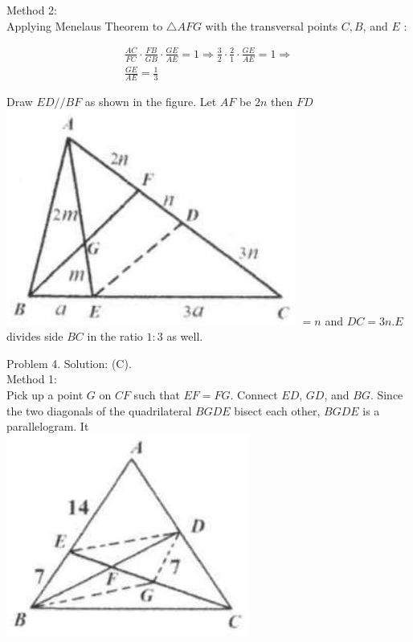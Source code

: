 \documentclass[10pt]{article}
\begin{document}
Method 2:\\
Applying Menelaus Theorem to \(\triangle A F G\) with the transversal points \(C, B\), and \(E\) :

\[
\begin{gathered}
\frac{A C}{F C} \cdot \frac{F B}{G B} \cdot \frac{G E}{A E}=1 \Rightarrow \frac{3}{2} \cdot \frac{2}{1} \cdot \frac{G E}{A E}=1 \Rightarrow \\
\frac{G E}{A E}=\frac{1}{3}
\end{gathered}
\]

Draw \(E D / / B F\) as shown in the figure. Let \(A F\) be \(2 n\) then \(F D\)\\
\includegraphics[max width=\textwidth]{2025_04_17_97bc1f7e44d93c271a88g-132(3)} \(=n\) and \(D C=3 n . E\) divides side \(B C\) in the ratio \(1: 3\) as well.

Problem 4. Solution: (C).\\
Method 1:\\
Pick up a point \(G\) on \(C F\) such that \(E F=F G\). Connect \(E D\), \(G D\), and \(B G\). Since the two diagonals of the quadrilateral \(B G D E\) bisect each other, \(B G D E\) is a parallelogram. It\\
\includegraphics[max width=\textwidth, center]{2025_04_17_97bc1f7e44d93c271a88g-132(2)}
\end{document}

